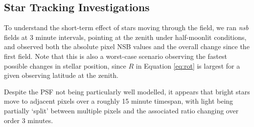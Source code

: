 \subsection{Star Tracking Investigations}

To understand the short-term effect of stars moving through the field, we ran \textit{nsb} fields at 3 minute intervals, pointing at the zenith under half-moonlit conditions, and observed both the absolute pixel NSB values and the overall change since the first field. Note that this is also a worst-case scenario observing the fastest possible changes in stellar position, since $R$ in Equation \ref{eq:rot} is largest for a given observing latitude at the zenith.

Despite the PSF not being particularly well modelled, it appears that bright stars move to adjacent pixels over a roughly 15 minute timespan, with light being partially `split' between multiple pixels and the associated ratio changing over order 3 minutes.
